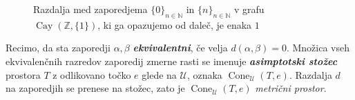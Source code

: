\documentclass[11pt]{book}
\def\NN{\mathbb{N}}
\def\ZZ{\mathbb{Z}}
\def\UU{\mathcal{U}}
\DeclareMathOperator\Cay{Cay}
\DeclareMathOperator\Cone{Cone}
\def\definicija{\color{rdeca}\bf\em}
\theoremstyle{definition}
\theoremstyle{zgled}
\theoremstyle{odprtproblem}
\theoremstyle{domacanaloga}
\theoremstyle{izrek}
\begin{document}
\begin{figure}[t]
    \centering
    \caption{Razdalja med zaporedjema $\{ 0 \}_{n \in \NN}$ in $\{ n \}_{n \in \NN}$ v grafu $\Cay(\ZZ, \{ 1 \})$, ki ga opazujemo od daleč, je enaka $1$}
\end{figure}

Recimo, da sta zaporedji $\alpha, \beta$ {\definicija ekvivalentni}, če velja $d(\alpha, \beta) = 0$. Množica vseh ekvivalenčnih razredov zaporedij zmerne rasti se imenuje {\definicija asimptotski stožec} prostora $T$ z odlikovano točko $e$ glede na $\UU$, oznaka $\Cone_\UU(T,e)$. Razdalja $d$ na zaporedjih se prenese na stožec, zato je $\Cone_\UU(T,e)$ {\em metrični prostor}.
\end{document}
